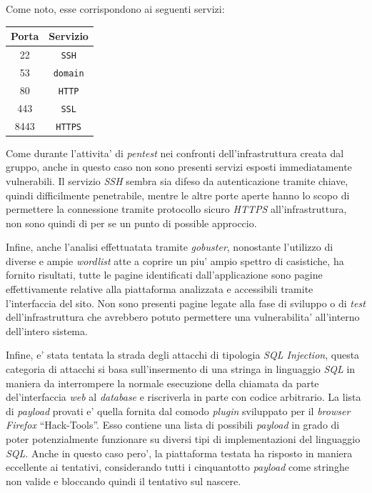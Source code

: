 \documentclass[a4paper]{report}
\newcommand{\quotes}[1]{``#1''}
\begin{document}
		Come noto, esse corrispondono ai seguenti servizi:
		\begin{center}
			\begin{tabular}{c c}
				Porta & Servizio \\
				\midrule
				22 & \texttt{SSH} \\
				53 & \texttt{domain} \\
				80 & \texttt{HTTP} \\
				443 & \texttt{SSL} \\
				8443 & \texttt{HTTPS}
			\end{tabular}
		\end{center}
		Come durante l'attivita' di \emph{pentest} nei confronti dell'infrastruttura creata dal gruppo, anche in questo
		caso non sono presenti servizi esposti immediatamente vulnerabili. Il servizio \emph{SSH} sembra sia difeso da
		autenticazione tramite chiave, quindi difficilmente penetrabile, mentre le altre porte aperte hanno lo scopo di
		permettere la connessione tramite protocollo sicuro \emph{HTTPS} all'infrastruttura, non sono quindi di per se
		un punto di possible approccio.

		Infine, anche l'analisi effettuatata tramite \emph{gobuster}, nonostante l'utilizzo di diverse e ampie
		\emph{wordlist} atte a coprire un piu' ampio spettro di casistiche, ha fornito risultati, tutte le pagine
		identificati dall'applicazione sono pagine effettivamente relative alla piattaforma analizzata e accessibili
		tramite l'interfaccia del sito. Non sono presenti pagine legate alla fase di sviluppo o di \emph{test}
		dell'infrastruttura che avrebbero potuto permettere una vulnerabilita' all'interno dell'intero sistema.

		Infine, e' stata tentata la strada degli attacchi di tipologia \emph{SQL Injection}, questa categoria di
		attacchi si basa sull'insermento di una stringa in linguaggio \emph{SQL} in maniera da interrompere la normale
		esecuzione della chiamata da parte del'interfaccia \emph{web} al \emph{database} e riscriverla in parte con
		codice arbitrario. La lista di \emph{payload} provati e' quella fornita dal comodo \emph{plugin} sviluppato per
		il \emph{browser Firefox} \quotes{Hack-Tools}. Esso contiene una lista di possibili \emph{payload} in grado di
		poter potenzialmente funzionare su diversi tipi di implementazioni del linguaggio \emph{SQL}. Anche in questo
		caso pero', la piattaforma testata ha risposto in maniera eccellente ai tentativi, considerando tutti i
		cinquantotto \emph{payload} come stringhe non valide e bloccando quindi il tentativo sul nascere.
\end{document}
